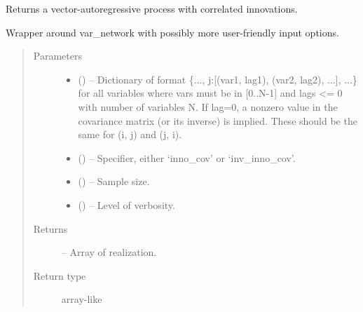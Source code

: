 \documentclass[letterpaper,10pt,english]{sphinxmanual}
\begin{document}

\begin{fulllineitems}
\label{\detokenize{index:tigramite.data_processing.var_process}}
Returns a vector-autoregressive process with correlated innovations.

Wrapper around var\_network with possibly more user-friendly input options.
\begin{quote}\begin{description}
\item[{Parameters}] \leavevmode\begin{itemize}
\item {} 
 () -- Dictionary of format \{..., j:{[}(var1, lag1), (var2, lag2), ...{]}, ...\} for
all variables where vars must be in {[}0..N-1{]} and lags \textless{}= 0 with number
of variables N. If lag=0, a nonzero value in the covariance matrix (or
its inverse) is implied. These should be the same for (i, j) and (j, i).

\item {} 
 (\sphinxstyleliteralemphasis{, }\sphinxstyleliteralemphasis{ (}\sphinxstyleliteralemphasis{)}\sphinxstyleliteralemphasis{}) -- Specifier, either `inno\_cov' or `inv\_inno\_cov'.

\item {} 
 (\sphinxstyleliteralemphasis{, }\sphinxstyleliteralemphasis{ (}\sphinxstyleliteralemphasis{)}\sphinxstyleliteralemphasis{}) -- Sample size.

\item {} 
 (\sphinxstyleliteralemphasis{, }\sphinxstyleliteralemphasis{ (}\sphinxstyleliteralemphasis{)}\sphinxstyleliteralemphasis{}) -- Level of verbosity.

\end{itemize}

\item[{Returns}] \leavevmode
{} -- Array of realization.

\item[{Return type}] \leavevmode
array-like

\end{description}\end{quote}

\end{fulllineitems}
\end{document}
